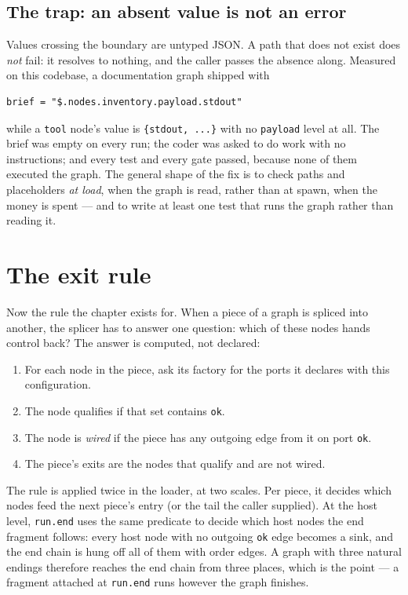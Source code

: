 \subsection{The trap: an absent value is not an error}

Values crossing the boundary are untyped JSON. A path that does not exist does \emph{not} fail: it
resolves to nothing, and the caller passes the absence along. Measured on this codebase, a
documentation graph shipped with

\begin{verbatim}
brief = "$.nodes.inventory.payload.stdout"
\end{verbatim}

while a \texttt{tool} node's value is \texttt{\{stdout, ...\}} with no \texttt{payload} level at all.
The brief was empty on every run; the coder was asked to do work with no instructions; and every test
and every gate passed, because none of them executed the graph. The general shape of the fix is to
check paths and placeholders \emph{at load}, when the graph is read, rather than at spawn, when the
money is spent --- and to write at least one test that runs the graph rather than reading it.


\section{The exit rule}

Now the rule the chapter exists for. When a piece of a graph is spliced into another, the splicer
has to answer one question: which of these nodes hands control back? The answer is computed, not
declared:

\begin{enumerate}
	\item For each node in the piece, ask its factory for the ports it declares with this
	configuration.
	\item The node qualifies if that set contains \texttt{ok}.
	\item The node is \emph{wired} if the piece has any outgoing edge from it on port \texttt{ok}.
	\item The piece's exits are the nodes that qualify and are not wired.
\end{enumerate}

The rule is applied twice in the loader, at two scales. Per piece, it decides which nodes feed the
next piece's entry (or the tail the caller supplied). At the host level, \texttt{run.end} uses the
same predicate to decide which host nodes the end fragment follows: every host node with no outgoing
\texttt{ok} edge becomes a sink, and the end chain is hung off all of them with order edges. A graph
with three natural endings therefore reaches the end chain from three places, which is the point ---
a fragment attached at \texttt{run.end} runs however the graph finishes.

